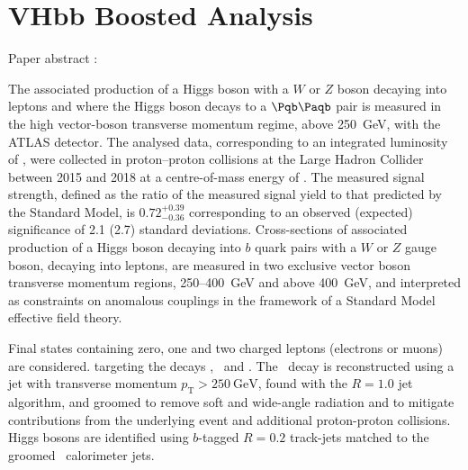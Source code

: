 \chapter{VHbb Boosted Analysis}\label{chap:vhbb_boosted}

Paper abstract :

The associated production of a Higgs boson with a $W$ or $Z$ boson
decaying into leptons and where the Higgs boson decays to a $\bbbar$
pair is measured in the high vector-boson transverse momentum regime,
above \SI{250}{\GeV}, with the ATLAS detector. The analysed data,
corresponding to an integrated luminosity of \intlumi, were collected
in proton--proton collisions at the Large Hadron Collider between
2015 and 2018 at a centre-of-mass energy of \sqsthirt. The measured
signal strength, defined as the ratio of the measured signal yield to
that predicted by the Standard Model, is $0.72 ^{+0.39}_{-0.36}$
corresponding to an observed (expected) significance of 2.1 (2.7)
standard deviations. Cross-sections of associated production of a
Higgs boson decaying into $b$ quark pairs with a $W$ or $Z$ gauge
boson, decaying into leptons, are measured in two exclusive
vector boson transverse momentum regions, 250--\SI{400}{\GeV} and above \SI{400}{\GeV}, and
interpreted as constraints on anomalous couplings in the framework of
a Standard Model effective field theory.

Final states containing zero, one and two charged
leptons (electrons or muons) are considered. targeting the
decays \Znn, \Wln\ and \Zll. The \hbb\ decay is reconstructed using a
jet with transverse momentum $p_{\mathrm{T}} > \SI{250}{\GeV}$, found with
the \antikt $R = 1.0$ jet algorithm, and groomed to remove soft
and wide-angle radiation and to mitigate contributions from the
underlying event and additional proton-proton collisions. Higgs
bosons are identified using $b$-tagged $R = 0.2$ track-jets matched
to the groomed \largeR\ calorimeter jets. 



